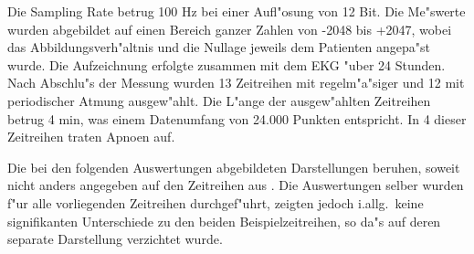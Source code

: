 Die Sampling Rate betrug 100 Hz bei einer Aufl"osung von 12 Bit. Die Me"swerte wurden
abgebildet auf einen Bereich ganzer Zahlen von -2048 bis +2047, wobei das
Abbildungsverh"altnis und die Nullage jeweils dem Patienten angepa"st wurde. Die
Aufzeichnung erfolgte zusammen mit dem EKG "uber 24 Stunden. Nach Abschlu"s der Messung
wurden 13 Zeitreihen mit regelm"a"siger und 12 mit periodischer Atmung ausgew"ahlt. Die
L"ange der ausgew"ahlten Zeitreihen betrug 4 min, was einem Datenumfang von 24.000 Punkten
entspricht.  In 4 dieser Zeitreihen traten Apnoen auf.

Die bei den folgenden Auswertungen abgebildeten Darstellungen beruhen, soweit nicht anders 
angegeben auf den Zeitreihen aus . Die Auswertungen selber wurden f"ur
alle vorliegenden Zeitreihen durchgef"uhrt, zeigten jedoch i.allg.\  keine signifikanten
Unterschiede zu den beiden Beispielzeitreihen, so da"s auf deren separate Darstellung
verzichtet wurde.

